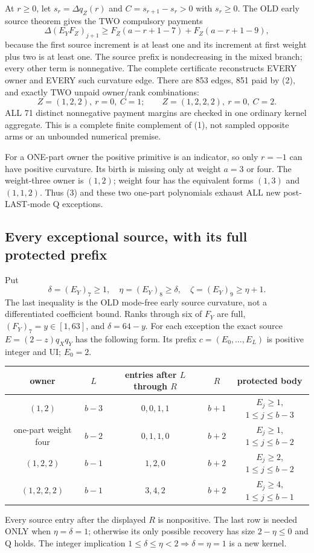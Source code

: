 At $r\ge0$, let $s_r=\Delta q_Z(r)$ and
$C=s_{r+1}-s_r>0$ with $s_r\ge0$.
The OLD early source theorem gives the TWO compulsory payments
\[
 \Delta(E_YF_Z)_{j+1}\ge F_Z(a-r+1-7)+F_Z(a-r+1-9),       \tag{2}
\]
because the first source increment is at least one and its increment
at first weight plus two is at least one. The source prefix is
nondecreasing in the mixed branch; every other term is nonnegative.
The complete certificate reconstructs EVERY owner and EVERY such
curvature edge. There are 853 edges, 851 paid by (2), and exactly TWO
unpaid owner/rank combinations:
\[
       Z=(1,2,2),\ r=0,\ C=1;\qquad
       Z=(1,2,2,2),\ r=0,\ C=2.                    \tag{3}
\]
ALL 71 distinct nonnegative payment margins are checked in one
ordinary kernel aggregate. This is a complete finite complement
of (1), not sampled opposite arms or an unbounded numerical premise.

For a ONE-part owner the positive primitive is an indicator, so only
$r=-1$ can have positive curvature. Its birth is missing only at
weight $a=3$ or four. The weight-three owner is $(1,2)$; weight
four has the equivalent forms $(1,3)$ and $(1,1,2)$.
Thus (3) and these two one-part polynomials exhaust ALL new
post-LAST-mode Q exceptions.

\subsection{Every exceptional source, with its full protected prefix}
Put
\[
 \delta=(E_Y)_7\ge1,\quad\eta=(E_Y)_8\ge\delta,
 \quad\zeta=(E_Y)_9\ge\eta+1.
\]
The last inequality is the OLD mode-free early source curvature,
not a differentiated coefficient bound. Ranks through six of $F_Y$
are full, $(F_Y)_7=y\in[1,63]$, and $\delta=64-y$.
For each exception the exact source $E=(2-z)q_Xq_Y$ has the
following form. Its prefix $c=(E_0,\ldots,E_L)$ is positive
integer and UI; $E_0=2$.
\begin{center}
\begin{tabular}{c|c|c|c|c}
owner & $L$ & entries after $L$ through $R$ & $R$ & protected body\\\hline
$(1,2)$ & $b-3$ & $0,0,1,1$ & $b+1$ & $E_j\ge1$, $1\le j\le b-3$\\
one-part weight four & $b-2$ & $0,1,1,0$ & $b+2$ & $E_j\ge1$, $1\le j\le b-2$\\
$(1,2,2)$ & $b-1$ & $1,2,0$ & $b+2$ & $E_j\ge2$, $1\le j\le b-2$\\
$(1,2,2,2)$ & $b-1$ & $3,4,2$ & $b+2$ & $E_j\ge4$, $1\le j\le b-1$
\end{tabular}
\end{center}
Every source entry after the displayed $R$ is nonpositive.
The last row is needed ONLY when $\eta=\delta=1$; otherwise
its only possible recovery has size $2-\eta\le0$ and Q holds.
The integer implication $1\le\delta\le\eta<2\Rightarrow\delta=\eta=1$
is a new kernel.

